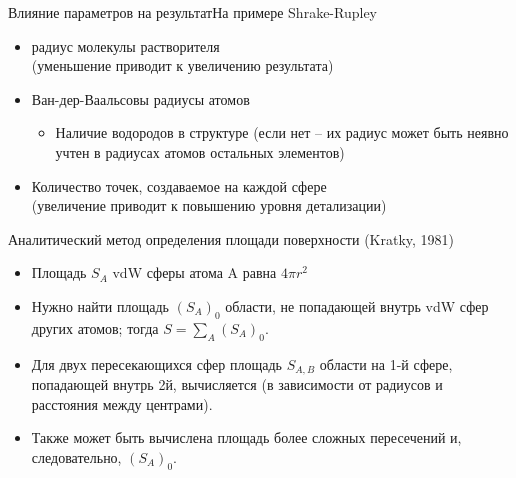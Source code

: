 \documentclass{beamer}
\begin{document}
    \begin{frame}{Влияние параметров на результат}{На примере Shrake-Rupley}
        \begin{itemize}
            \item радиус молекулы растворителя \\
                (уменьшение приводит к увеличению результата)
            \item Ван-дер-Ваальсовы радиусы атомов
                \begin{itemize}
                \item Наличие водородов в структуре (если нет -- их радиус может
                    быть неявно учтен в радиусах атомов остальных элементов)
                \end{itemize}
            \item Количество точек, создаваемое на каждой сфере \\
                (увеличение приводит к повышению уровня детализации)
        \end{itemize}
    \end{frame}

    \begin{frame}{Аналитический метод определения площади поверхности
        (Kratky, 1981)}
        \begin{itemize}
            \item Площадь $S_A$ vdW сферы атома A равна $4\pi r^2$
            \item Нужно найти площадь $(S_A)_0$  области, не попадающей внутрь
                vdW сфер других атомов; тогда $S=\sum\limits_A (S_A)_0$.
            \item Для двух пересекающихся сфер площадь $S_{A,B}$
                области на 1-й сфере, попадающей внутрь 2й, вычисляется
                (в зависимости от радиусов и расстояния между центрами).
            \item Также может быть вычислена площадь
                более сложных пересечений и, следовательно, $(S_A)_0$.
        \end{itemize}
    \end{frame}
\end{document}
